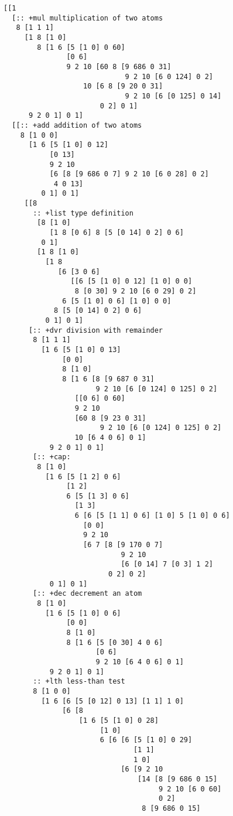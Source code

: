 \documentclass[twoside]{article}
\begin{document}
\begin{lstlisting}[style=listingcode]
[[1
  [:: +mul multiplication of two atoms
   8 [1 1 1]
     [1 8 [1 0]
        8 [1 6 [5 [1 0] 0 60]
               [0 6]
               9 2 10 [60 8 [9 686 0 31]
                             9 2 10 [6 0 124] 0 2]
                   10 [6 8 [9 20 0 31]
                             9 2 10 [6 [0 125] 0 14]
                       0 2] 0 1]
      9 2 0 1] 0 1]
  [[:: +add addition of two atoms
    8 [1 0 0]
      [1 6 [5 [1 0] 0 12]
           [0 13]
           9 2 10
           [6 [8 [9 686 0 7] 9 2 10 [6 0 28] 0 2]
            4 0 13]
         0 1] 0 1]
     [[8
       :: +list type definition
        [8 [1 0]
           [1 8 [0 6] 8 [5 [0 14] 0 2] 0 6]
         0 1]
        [1 8 [1 0]
          [1 8
             [6 [3 0 6]
                [[6 [5 [1 0] 0 12] [1 0] 0 0]
                 8 [0 30] 9 2 10 [6 0 29] 0 2]
              6 [5 [1 0] 0 6] [1 0] 0 0]
            8 [5 [0 14] 0 2] 0 6]
          0 1] 0 1]
      [:: +dvr division with remainder
       8 [1 1 1]
         [1 6 [5 [1 0] 0 13]
              [0 0]
              8 [1 0]
              8 [1 6 [8 [9 687 0 31]
                      9 2 10 [6 [0 124] 0 125] 0 2]
                 [[0 6] 0 60]
                 9 2 10
                 [60 8 [9 23 0 31]
                       9 2 10 [6 [0 124] 0 125] 0 2]
                 10 [6 4 0 6] 0 1]
           9 2 0 1] 0 1]
       [:: +cap: 
        8 [1 0]
          [1 6 [5 [1 2] 0 6]
               [1 2]
               6 [5 [1 3] 0 6]
                 [1 3]
                 6 [6 [5 [1 1] 0 6] [1 0] 5 [1 0] 0 6]
                   [0 0]
                   9 2 10
                   [6 7 [8 [9 170 0 7]
                            9 2 10
                            [6 [0 14] 7 [0 3] 1 2]
                         0 2] 0 2]
           0 1] 0 1]
       [:: +dec decrement an atom
        8 [1 0]
          [1 6 [5 [1 0] 0 6]
               [0 0]
               8 [1 0]
               8 [1 6 [5 [0 30] 4 0 6]
                      [0 6]
                      9 2 10 [6 4 0 6] 0 1]
           9 2 0 1] 0 1]
       :: +lth less-than test
       8 [1 0 0]
         [1 6 [6 [5 [0 12] 0 13] [1 1] 1 0]
              [6 [8
                  [1 6 [5 [1 0] 0 28]
                       [1 0]
                       6 [6 [6 [5 [1 0] 0 29]
                               [1 1]
                               1 0]
                            [6 [9 2 10
                                [14 [8 [9 686 0 15]
                                     9 2 10 [6 0 60]
                                     0 2]
                                 8 [9 686 0 15]

\end{lstlisting}
\end{document}
